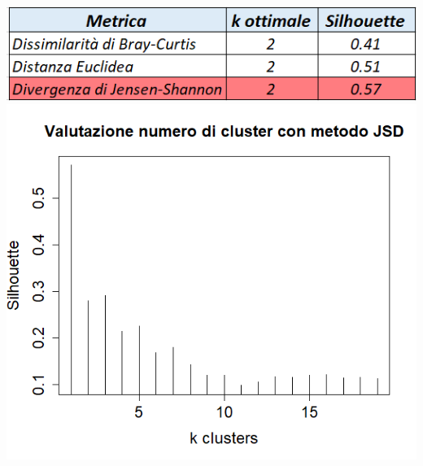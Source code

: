\begin{Figure}
\begin{multicols}{2}
    \centering
         \vspace*{1.7cm}
     \includegraphics[width=\linewidth,keepaspectratio, scale=0.3]{images/real_tabella.PNG}
    \includegraphics[width=\linewidth,keepaspectratio]{images/silhouette.png}
     \end{multicols}
  \end{Figure}

